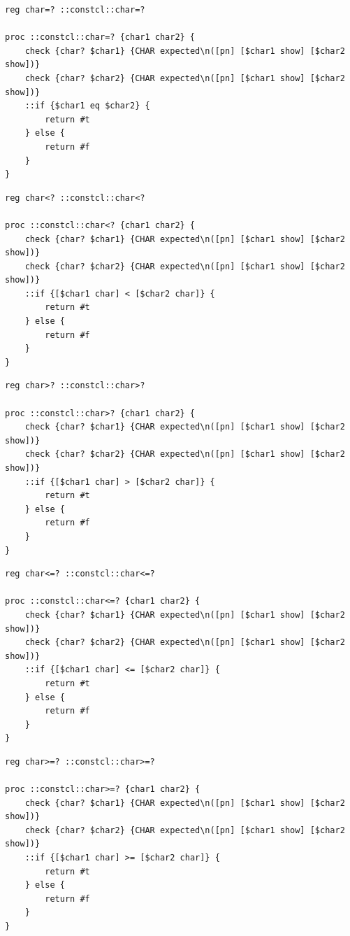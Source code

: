 \documentclass[twoside,9pt]{report}
\begin{document}
\noindent\makebox[\linewidth]{\rule{\linewidth}{0.4pt}}
\begin{lstlisting}
reg char=? ::constcl::char=?
 
proc ::constcl::char=? {char1 char2} {
    check {char? $char1} {CHAR expected\n([pn] [$char1 show] [$char2 show])}
    check {char? $char2} {CHAR expected\n([pn] [$char1 show] [$char2 show])}
    ::if {$char1 eq $char2} {
        return #t
    } else {
        return #f
    }
}
\end{lstlisting}
\noindent\makebox[\linewidth]{\rule{\linewidth}{0.4pt}}
\noindent\makebox[\linewidth]{\rule{\linewidth}{0.4pt}}
\begin{lstlisting}
reg char<? ::constcl::char<?
 
proc ::constcl::char<? {char1 char2} {
    check {char? $char1} {CHAR expected\n([pn] [$char1 show] [$char2 show])}
    check {char? $char2} {CHAR expected\n([pn] [$char1 show] [$char2 show])}
    ::if {[$char1 char] < [$char2 char]} {
        return #t
    } else {
        return #f
    }
}
\end{lstlisting}
\noindent\makebox[\linewidth]{\rule{\linewidth}{0.4pt}}
\noindent\makebox[\linewidth]{\rule{\linewidth}{0.4pt}}
\begin{lstlisting}
reg char>? ::constcl::char>?
 
proc ::constcl::char>? {char1 char2} {
    check {char? $char1} {CHAR expected\n([pn] [$char1 show] [$char2 show])}
    check {char? $char2} {CHAR expected\n([pn] [$char1 show] [$char2 show])}
    ::if {[$char1 char] > [$char2 char]} {
        return #t
    } else {
        return #f
    }
}
\end{lstlisting}
\noindent\makebox[\linewidth]{\rule{\linewidth}{0.4pt}}
\noindent\makebox[\linewidth]{\rule{\linewidth}{0.4pt}}
\begin{lstlisting}
reg char<=? ::constcl::char<=?
 
proc ::constcl::char<=? {char1 char2} {
    check {char? $char1} {CHAR expected\n([pn] [$char1 show] [$char2 show])}
    check {char? $char2} {CHAR expected\n([pn] [$char1 show] [$char2 show])}
    ::if {[$char1 char] <= [$char2 char]} {
        return #t
    } else {
        return #f
    }
}
\end{lstlisting}
\noindent\makebox[\linewidth]{\rule{\linewidth}{0.4pt}}
\noindent\makebox[\linewidth]{\rule{\linewidth}{0.4pt}}
\begin{lstlisting}
reg char>=? ::constcl::char>=?
 
proc ::constcl::char>=? {char1 char2} {
    check {char? $char1} {CHAR expected\n([pn] [$char1 show] [$char2 show])}
    check {char? $char2} {CHAR expected\n([pn] [$char1 show] [$char2 show])}
    ::if {[$char1 char] >= [$char2 char]} {
        return #t
    } else {
        return #f
    }
}
\end{lstlisting}
\noindent\makebox[\linewidth]{\rule{\linewidth}{0.4pt}}
\end{document}
